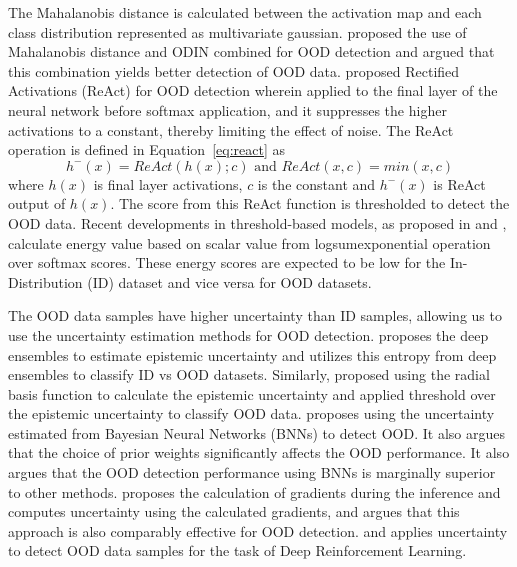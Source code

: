     The Mahalanobis distance is calculated between the activation map and each class distribution represented as multivariate gaussian.
    \cite{Maha_plus_ODIN} proposed the use of Mahalanobis distance and ODIN combined for OOD detection and argued that this combination yields better detection of OOD data.
    \cite{ReAct} proposed Rectified Activations (ReAct) for OOD detection wherein applied to the final layer of the neural network before softmax application, and it suppresses the higher activations to a constant, thereby limiting the effect of noise. 
    The ReAct operation is defined in Equation~\ref{eq:react} as
    \begin{equation}
        h^{-}(x) = ReAct(h(x); c) \text{ and } ReAct(x, c) = min(x, c) \label{eq:react}
    \end{equation} 
    where $h(x)$ is final layer activations, $c$ is the constant and $h^{-}(x)$ is ReAct output of $h(x)$.
    The score from this ReAct function is thresholded to detect the OOD data. 
    Recent developments in threshold-based models, as proposed in \cite{Energy_OOD_1} and \cite{Energy_OOD_2}, calculate energy value based on scalar value from logsumexponential operation over softmax scores.
    These energy scores are expected to be low for the In-Distribution (ID) dataset and vice versa for OOD datasets.

    The OOD data samples have higher uncertainty than ID samples, allowing us to use the uncertainty estimation methods for OOD detection.
    \cite{lakshminarayanan2016simple} proposes the deep ensembles to estimate epistemic uncertainty and utilizes this entropy from deep ensembles to classify ID vs OOD datasets.
    Similarly, \cite{JAmersfoot_RBF} proposed using the radial basis function to calculate the epistemic uncertainty and applied threshold over the epistemic uncertainty to classify OOD data.
    \cite{UOOD_BNN} proposes using the uncertainty estimated from Bayesian Neural Networks (BNNs) to detect OOD.
    It also argues that the choice of prior weights significantly affects the OOD performance.
    It also argues that the OOD detection performance using BNNs is marginally superior to other methods.
    \cite{Grad_UOOD} proposes the calculation of gradients during the inference and computes uncertainty using the calculated gradients, and argues that this approach is also comparably effective for OOD detection.
    \cite{UOOD_RL1} and \cite{UOOD_RL2} applies uncertainty to detect OOD data samples for the task of Deep Reinforcement Learning.
    
